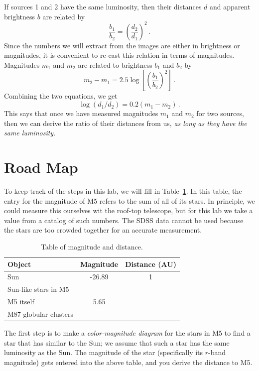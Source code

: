If sources 1 and 2 have the same luminosity, then their distances $d$ and apparent brightness
$b$ are related by
\begin{equation}
\frac{b_1}{b_2} = \left( \frac{d_2}{d_1} \right)^2 \,.
\end{equation}
Since the numbers we will extract from the images are either in brightness or magnitudes,
it is convenient to re-cast this relation in terms of magnitudes. Magnitudes $m_1$ and $m_2$ are
related to brightness $b_1$ and $b_2$ by
\begin{equation}
m_2 - m_1 = 2.5 \log \left[ \left( \frac{b_1}{b_2} \right)^2 \right] \,.
\end{equation}
Combining the two equations, we get
\begin{equation}\label{gc:eq:m-d}
 \log(d_1/d_2) = 0.2 (m_1-m_2) \,.
\end{equation}
This says that once we have measured magnitudes $m_1$ and $m_2$ for two sources, then we can
derive the ratio of their distances from us, \textit{as long as they have the same luminosity}.

\section{Road Map}

To keep track of the steps in this lab, we will fill in Table~\ref{gc:tab:mag}. In this table, the entry for the magnitude of M5 refers to the sum of all of its stars. In
principle, we could measure this ourselves wit the roof-top telescope, but for this lab we take
a value from a catalog of such numbers. The SDSS data cannot be used because the stars
are too crowded together for an accurate measurement.

\begin{table}
	\centering
	\begin{tabular}{lcc}
		\toprule
		Object & Magnitude & Distance (AU) \\ \midrule
		Sun & -26.89 & 1 \\
		Sun-like stars in M5 &  & \\
		M5 itself & 5.65 & \\
		M87 globular clusters & &
		\\ \bottomrule
	\end{tabular}
	\caption{Table of magnitude and distance.}\label{gc:tab:mag}
\end{table}

The first step is to make a \textit{color-magnitude diagram} for the stars in M5 to find a star that
has similar to the Sun; we assume that such a star has the same luminosity as the Sun. The
magnitude of the star (specifically its $r$-band magnitude) gets entered into the above table,
and you derive the distance to M5.

